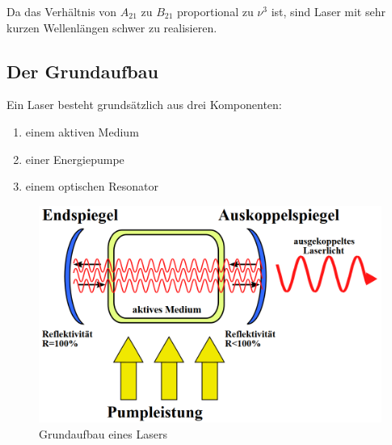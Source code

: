 Da das Verhältnis von $A_{21}$ zu $B_21$ proportional zu $\nu^3$ ist, sind Laser mit sehr kurzen Wellenlängen schwer zu realisieren.

\subsection{Der Grundaufbau}

Ein Laser besteht grundsätzlich aus drei Komponenten:
\begin{enumerate}
\item einem aktiven Medium
\item einer Energiepumpe
\item einem optischen Resonator
\end{enumerate}

\vspace{1cm}

\begin{figure}[h]
\begin{center}
\includegraphics[scale=0.3]{img/HNL3.png}
\caption{Grundaufbau eines Lasers}
\end{center}
\end{figure}

